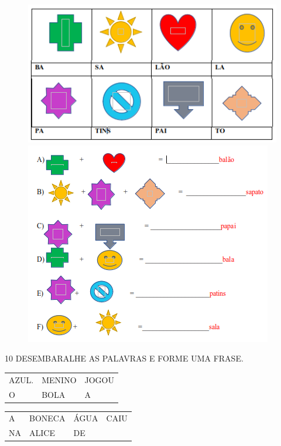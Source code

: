 \begin{figure}[htpb!]
\includegraphics[width=\textwidth]{media/flag1.png}

\includegraphics[width=\textwidth]{media/flag2.png}
\end{figure}


\num{10} DESEMBARALHE AS PALAVRAS E FORME UMA FRASE.

\begin{longtable}[]{@{}lll@{}}
\toprule
AZUL. & MENINO & JOGOU\tabularnewline
O & BOLA & A\tabularnewline
\bottomrule
\end{longtable}


\begin{longtable}[]{@{}llll@{}}
\toprule
A & BONECA & ÁGUA & CAIU\tabularnewline
NA & ALICE & DE\tabularnewline
\bottomrule
\end{longtable}

